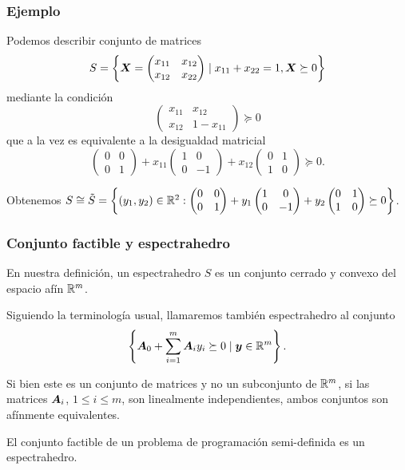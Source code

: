\documentclass[aspectratio=169,12pt,spanish]{beamer}
\begin{document}
\begin{frame}
\frametitle{Ejemplo}

Podemos describir conjunto de matrices
$$
S = \left\{\bm{X} = \begin{pmatrix}
x_{11} & x_{12} \\
x_{12} & x_{22}
\end{pmatrix} \mid x_{11} + x_{22} = 1, \bm{X} \succeq 0\right\}
$$
mediante la condición
$$
\begin{pmatrix}
x_{11} & x_{12} \\
x_{12} & 1 - x_{11}
\end{pmatrix}  \succeq 0
$$
que a la vez es equivalente a la desigualdad matricial
$$
\begin{pmatrix}
0 & 0 \\
0 & 1
\end{pmatrix}  +
x_{11}
\begin{pmatrix}
1 & 0 \\
0 & - 1
\end{pmatrix}  +
x_{12}
\begin{pmatrix}
0 & 1 \\
1 & 0
\end{pmatrix}\succeq 0.
$$

Obtenemos $S \cong \tilde S = \left\{(y_1, y_2) \in \mathbb{R}^2 : \begin{pmatrix}
0 & 0 \\
0 & 1
\end{pmatrix}  +
y_1
\begin{pmatrix}
1 & 0 \\
0 & - 1
\end{pmatrix}  +
y_2
\begin{pmatrix}
0 & 1 \\
1 & 0
\end{pmatrix} \succeq 0
\right\}$.
\end{frame}


\begin{frame}
\frametitle{Conjunto factible y espectrahedro}

En nuestra definición, un espectrahedro $S$ es un conjunto cerrado y convexo del espacio afín $\mathbb{R}^m$.

Siguiendo la terminología usual, llamaremos también espectrahedro al conjunto
$$\left\{ \bm{A}_0 + \sum_{i = 1}^m \bm{A}_i y_i \succeq 0 \mid \bm{y} \in \mathbb{R}^m \right\}.$$

Si bien este es un conjunto de matrices y no un subconjunto de $\mathbb{R}^m$, si las matrices $\bm{A}_i$, $1 \le i \le m$, son linealmente independientes, ambos conjuntos son afínmente equivalentes.

El conjunto factible de un problema de programación semi-definida es un espectrahedro.
\end{frame}
\end{document}
